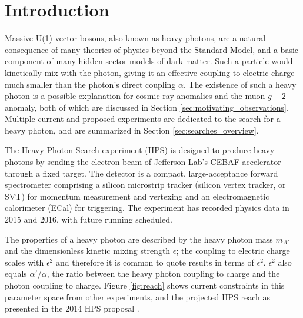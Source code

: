 \chapter{Introduction}
Massive U(1) vector bosons, also known as heavy photons, are a natural consequence of many theories of physics beyond the Standard Model, and a basic component of many hidden sector models of dark matter.
Such a particle would kinetically mix with the photon, giving it an effective coupling to electric charge much smaller than the photon's direct coupling $\alpha$.
The existence of such a heavy photon is a possible explanation for cosmic ray anomalies and the muon $g-2$ anomaly, both of which are discussed in Section \ref{sec:motivating_observations}.
Multiple current and proposed experiments are dedicated to the search for a heavy photon, and are summarized in Section \ref{sec:searches_overview}.

The Heavy Photon Search experiment (HPS) is designed to produce heavy photons by sending the electron beam of Jefferson Lab's CEBAF accelerator through a fixed target.
The detector is a compact, large-acceptance forward spectrometer comprising a silicon microstrip tracker (silicon vertex tracker, or SVT) for momentum measurement and vertexing and an electromagnetic calorimeter (ECal) for triggering.
The experiment has recorded physics data in 2015 and 2016, with future running scheduled.

The properties of a heavy photon are described by the heavy photon mass $m_{A'}$ and the dimensionless kinetic mixing strength $\epsilon$; the coupling to electric charge scales with $\epsilon^2$ and therefore it is common to quote results in terms of $\epsilon^2$.
$\epsilon^2$ also equals $\alpha'/\alpha$, the ratio between the heavy photon coupling to charge and the photon coupling to charge.
Figure \ref{fig:reach} shows current constraints in this parameter space from other experiments, and the projected HPS reach as presented in the 2014 HPS proposal \cite{collaboration_heavy_2013}.

